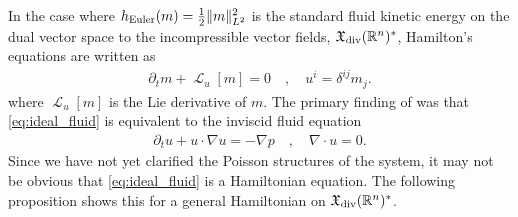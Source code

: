 \documentclass[12pt]{amsart}
\newcommand{\R}{\ensuremath{\mathbb{R}}}
\DeclareMathOperator{\lie}{\mathcal{L}}
\begin{document}
In the case where $h_{\rm Euler}(m) = \frac{1}{2} \| m \|^2_{L^2}$ is the standard fluid kinetic energy on the
dual vector space to the incompressible vector fields, $\mathfrak{X}_{\rm div}(\mathbb{R}^n)^*$, 
Hamilton's equations are written as
\begin{align}
	\partial_t m+ \lie_u [ m] = 0 \quad , \quad u^i = \delta^{ij} m_j. \label{eq:ideal_fluid}
\end{align}
where $\lie_u[m]$ is the Lie derivative of $m$.
The primary finding of \cite{Arnold1966} was that \eqref{eq:ideal_fluid} is equivalent to the
inviscid fluid equation
\begin{align*}
	\partial_t u + u \cdot \nabla u = - \nabla p \quad , \quad  \nabla \cdot u = 0.
\end{align*}
Since we have not yet clarified the Poisson structures of the system, it may not be obvious that \eqref{eq:ideal_fluid} is a Hamiltonian equation. The following proposition shows this for a general Hamiltonian  on $\mathfrak{X}_{\rm div}(\R^n)^*$.
\end{document}
